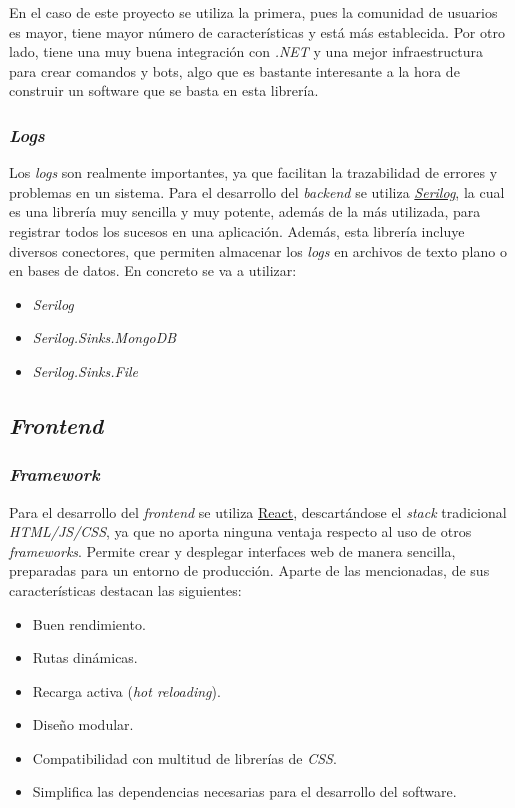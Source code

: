 En el caso de este proyecto se utiliza la primera, pues la comunidad de usuarios es mayor, tiene mayor número de características y está más establecida. Por otro lado, tiene una muy buena integración con \textit{.NET} y una mejor infraestructura para crear comandos y bots, algo que es bastante interesante a la hora de construir un software que se basta en esta librería.

\subsubsection{\textit{Logs}}

Los \textit{logs} son realmente importantes, ya que facilitan la trazabilidad de errores y problemas en un sistema. Para el desarrollo del \textit{backend} se utiliza \href{https://serilog.net/}{\textit{Serilog}}, la cual es una librería muy sencilla y muy potente, además de la más utilizada, para registrar todos los sucesos en una aplicación. Además, esta librería incluye diversos conectores, que permiten almacenar los \textit{logs} en archivos de texto plano o en bases de datos. En concreto se va a utilizar:

\begin{itemize}
	\item \textit{Serilog}
	\item \textit{Serilog.Sinks.MongoDB}
	\item \textit{Serilog.Sinks.File}
\end{itemize}

\subsection{\textit{Frontend}} 

\subsubsection{\textit{Framework}}

Para el desarrollo del \textit{frontend} se utiliza \href{https://es.reactjs.org/}{React}, descartándose el \textit{stack} tradicional \textit{HTML/JS/CSS}, ya que no aporta ninguna ventaja respecto al uso de otros \textit{frameworks}. Permite crear y desplegar interfaces web de manera sencilla, preparadas para un entorno de producción. Aparte de las mencionadas, de sus características destacan las siguientes:

\begin{itemize}
	\item Buen rendimiento.
	\item Rutas dinámicas.
	\item Recarga activa (\textit{hot reloading}).
	\item Diseño modular.
	\item Compatibilidad con multitud de librerías de \textit{CSS}.
	\item Simplifica las dependencias necesarias para el desarrollo del software.
\end{itemize}

